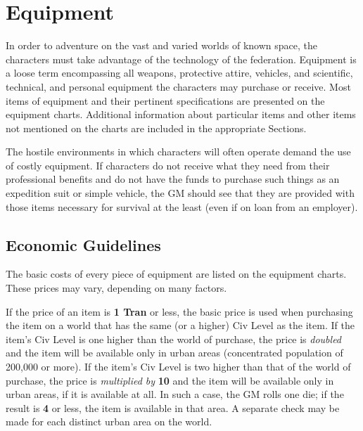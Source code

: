 \chapter{Equipment}
\label{cha:equipment}

In order to adventure on the vast and varied worlds of known space,
the characters must take advantage of the technology of the
federation. Equipment is a loose term encompassing all weapons,
protective attire, vehicles, and scientific, technical, and personal
equipment the characters may purchase or receive. Most items of
equipment and their pertinent specifications are presented on the
equipment charts. Additional information about particular items and
other items not mentioned on the charts are included in the
appropriate Sections.

The hostile environments in which characters will often operate demand
the use of costly equipment. If characters do not receive what they
need from their professional benefits and do not have the funds to
purchase such things as an expedition suit or simple vehicle, the GM
should see that they are provided with those items necessary for
survival at the least (even if on loan from an employer).

\section{Economic Guidelines}
\label{sec:economic-guidelines}
 
The basic costs of every piece of equipment are listed on the
equipment charts. These prices may vary, depending on many factors.

If the price of an item is \textbf{1 Tran} or less, the basic price is used
when purchasing the item on a world that has the same (or a higher)
Civ Level as the item. If the item's Civ Level is one higher than the
world of purchase, the price is \emph{doubled} and the item will be
available only in urban areas (concentrated population of 200,000 or
more). If the item's Civ Level is two higher than that of the world of
purchase, the price is \emph{multiplied by} \textbf{10} and the item will be
available only in urban areas, if it is available at all. In such a
case, the GM rolls one die; if the result is \textbf{4} or less, the item is
available in that area. A separate check may be made for each distinct
urban area on the world.


